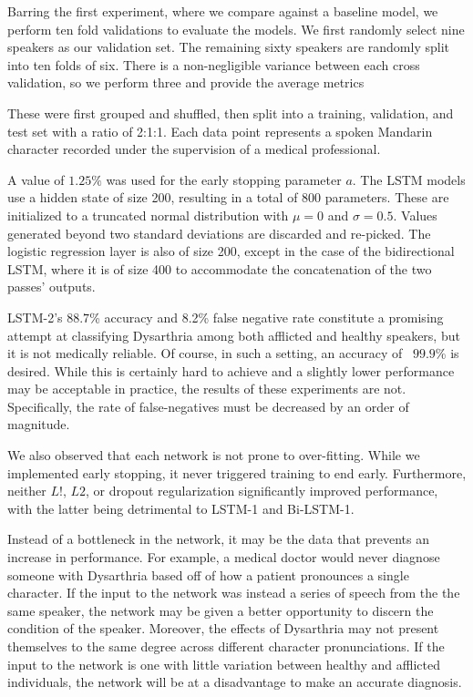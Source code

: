  Barring the first experiment, where we compare against a baseline model, we perform ten fold validations to evaluate the models. We first randomly select nine speakers as our validation set. The remaining sixty speakers are randomly split into ten folds of six. There is a non-negligible variance between each cross validation, so we perform three and provide the average metrics

These were first grouped and shuffled, then split into a training, validation, and test set with a ratio of 2:1:1. Each data point represents a spoken Mandarin character recorded under the supervision of a medical professional. 

A value of $1.25\%$ was used for the early stopping parameter $a$. The LSTM models use a hidden state of size 200, resulting in a total of 800 parameters. These are initialized to a truncated normal distribution with $\mu = 0$ and $\sigma = 0.5$. Values generated beyond two standard deviations are discarded and re-picked. The logistic regression layer is also of size 200, except in the case of the bidirectional LSTM, where it is of size 400 to accommodate the concatenation of the two passes' outputs.

LSTM-2's $88.7$\% accuracy and 8.2\% false negative rate constitute a promising attempt at classifying Dysarthria among both afflicted and healthy speakers, but it is not medically reliable. Of course, in such a setting, an accuracy of ~$99.9$\% is desired. While this is certainly hard to achieve and a slightly lower performance may be acceptable in practice, the results of these experiments are not. Specifically, the rate of false-negatives must be decreased by an order of magnitude. 

We also observed that each network is not prone to over-fitting. While we implemented early stopping, it never triggered training to end early. Furthermore, neither $L!$, $L2$, or dropout regularization significantly improved performance, with the latter being detrimental to LSTM-1 and Bi-LSTM-1. 

Instead of a bottleneck in the network, it may be the data that prevents an increase in performance. For example, a medical doctor would never diagnose someone with Dysarthria based off of how a patient pronounces a single character. If the input to the network was instead a series of speech from the the same speaker, the network may be given a better opportunity to discern the condition of the speaker. Moreover, the effects of Dysarthria may not present themselves to the same degree across different character pronunciations. If the input to the network is one with little variation between healthy and afflicted individuals, the network will be at a disadvantage to make an accurate diagnosis. 
